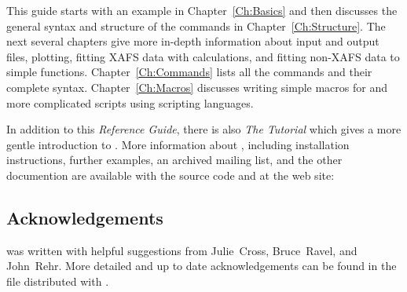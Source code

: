 This guide starts with an example in Chapter~\ref{Ch:Basics} and then
discusses the general syntax and structure of the commands in
Chapter~\ref{Ch:Structure}.  The next several chapters give more in-depth
information about input and output files, plotting, fitting XAFS data with
{\feff} calculations, and fitting non-XAFS data to simple functions.
Chapter~\ref{Ch:Commands} lists all the commands and their complete syntax.
Chapter~\ref{Ch:Macros} discusses writing simple macros for {\ifeffit} and
more complicated scripts using scripting languages.

In addition to this {\textsl{Reference Guide}}, there is also {\textsl{The
    {\ifeffit} Tutorial}} which gives a more gentle introduction to
{\ifeffit}.  More information about {\ifeffit}, including installation
instructions, further examples, an archived mailing list, and the other
documention are available with the source code and at the {\ifeffit} web
site: {\WWWiff}

\subsection*{Acknowledgements} \label{ch:intro-ack}

{\ifeffit} was written with helpful suggestions from Julie~Cross,
Bruce~Ravel, and John~Rehr.  More detailed and up to date acknowledgements
can be found in the {} file distributed with {\ifeffit}.

